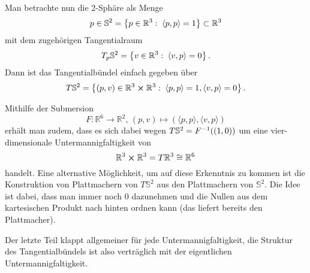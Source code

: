 \documentclass[../H_Analysis_main.tex]{subfiles}
\begin{document}
\begin{bsp}[Sphäre]
Man betrachte nun die 2-Sphäre als Menge
\begin{equation*}
p \in \mathbb{S}^2 = \qty{p \in \mathbb{R}^3: \; \langle p, p \rangle = 1} \subset \mathbb{R}^3
\end{equation*}
mit dem zugehörigen Tangentialraum
\begin{equation*}
T_p \mathbb{S}^2 = \qty{v \in \mathbb{R}^3: \; \langle v, p \rangle = 0} \, .
\end{equation*}
Dann ist das Tangentialbündel einfach gegeben über
\begin{equation}
T\mathbb{S}^2 = \qty{(p, v) \in \mathbb{R}^3 \cross \mathbb{R}^3: \; \langle p, p \rangle = 1, \langle v, p \rangle = 0} \, .
\end{equation}

Mithilfe der Submersion
\begin{equation}
F: \mathbb{R}^6 \rightarrow \mathbb{R}^2, \, (p, v) \mapsto (\langle p, p \rangle, \langle v, p \rangle)
\end{equation}
erhält man zudem, dass es sich dabei wegen $T\mathbb{S}^2 = F^{-1}\qty((1, 0))$ um eine vier-dimensionale Untermannigfaltigkeit von
\begin{equation*}
\mathbb{R}^3 \cross \mathbb{R}^3 = T\mathbb{R}^3 \cong \mathbb{R}^6
\end{equation*}
handelt. Eine alternative Möglichkeit, um auf diese Erkenntnis zu kommen ist die Konstruktion von Plattmachern von $T\mathbb{S}^2$ aus den Plattmachern von $\mathbb{S}^2$. Die Idee ist dabei, dass man immer noch $\qty{0}$ dazunehmen und die Nullen aus dem kartesischen Produkt nach hinten ordnen kann (das liefert bereits den Plattmacher).
\end{bsp}
Der letzte Teil klappt allgemeiner für jede Untermannigfaltigkeit, die Struktur des Tangentialbündels ist also verträglich mit der eigentlichen Untermannigfaltigkeit.\\
\end{document}
